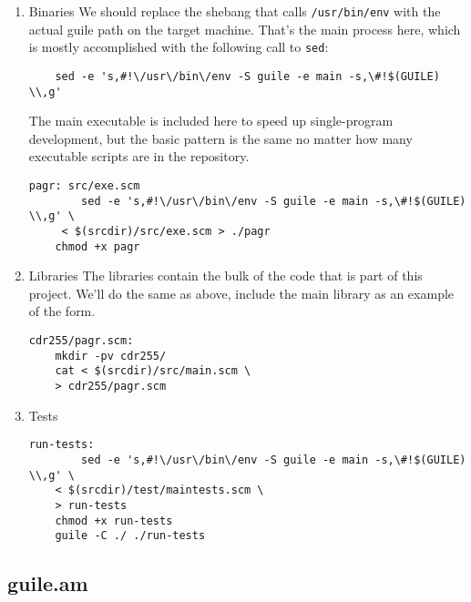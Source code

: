 \documentclass[11pt]{article}
\begin{document}
\begin{enumerate}
\item Binaries
\label{sec:orgcf32aa8}
We should replace the shebang that calls \texttt{/usr/bin/env} with the actual guile
path on the target machine. That's the main process here, which is mostly
accomplished with the following call to \texttt{sed}:

\begin{verbatim}
	sed -e 's,#!\/usr\/bin\/env -S guile -e main -s,\#!$(GUILE) \\,g'
\end{verbatim}

The main executable is included here to speed up single-program development, but
the basic pattern is the same no matter how many executable scripts are in the
repository.

\begin{verbatim}
pagr: src/exe.scm
		sed -e 's,#!\/usr\/bin\/env -S guile -e main -s,\#!$(GUILE) \\,g' \
	 < $(srcdir)/src/exe.scm > ./pagr
	chmod +x pagr
\end{verbatim}

\item Libraries
\label{sec:org4609c32}
The libraries contain the bulk of the code that is part of this project. We'll
do the same as above, include the main library as an example of the form.

\begin{verbatim}
cdr255/pagr.scm:
	mkdir -pv cdr255/
	cat < $(srcdir)/src/main.scm \
	> cdr255/pagr.scm
\end{verbatim}

\item Tests
\label{sec:orgcf3eef6}
\begin{verbatim}
run-tests:
		sed -e 's,#!\/usr\/bin\/env -S guile -e main -s,\#!$(GUILE) \\,g' \
	< $(srcdir)/test/maintests.scm \
	> run-tests
	chmod +x run-tests
	guile -C ./ ./run-tests
\end{verbatim}
\end{enumerate}
\subsection{guile.am}
\label{sec:orgf6ad58c}
\end{document}
